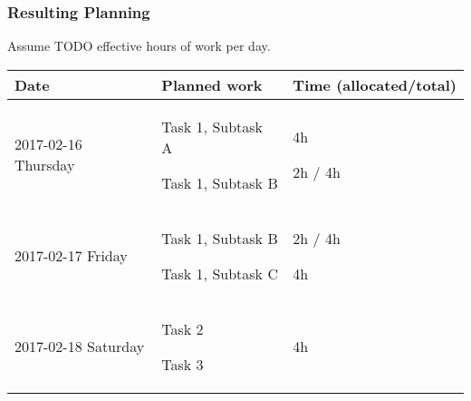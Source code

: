 \subsubsection{Resulting Planning}\label{resulting-planning}
Assume TODO effective hours of work per day.

\begin{longtable}[c]{@{}lll@{}}
\toprule
\begin{minipage}[b]{0.28\columnwidth}\raggedright\strut
Date
\strut\end{minipage} &
\begin{minipage}[b]{0.25\columnwidth}\raggedright\strut
Planned work
\strut\end{minipage} &
\begin{minipage}[b]{0.32\columnwidth}\raggedright\strut
Time (allocated/total)
\strut\end{minipage}\tabularnewline
\midrule
\endhead
\begin{minipage}[t]{0.28\columnwidth}\raggedright\strut
2017-02-16 Thursday
\strut\end{minipage} &
\begin{minipage}[t]{0.25\columnwidth}\raggedright\strut
Task 1, Subtask A

Task 1, Subtask B
\strut\end{minipage} &
\begin{minipage}[t]{0.32\columnwidth}\raggedright\strut
4h

2h / 4h
\strut\end{minipage}\tabularnewline
\begin{minipage}[t]{0.28\columnwidth}\raggedright\strut
2017-02-17 Friday
\strut\end{minipage} &
\begin{minipage}[t]{0.25\columnwidth}\raggedright\strut
Task 1, Subtask B

Task 1, Subtask C
\strut\end{minipage} &
\begin{minipage}[t]{0.32\columnwidth}\raggedright\strut
2h / 4h

4h
\strut\end{minipage}\tabularnewline
\begin{minipage}[t]{0.28\columnwidth}\raggedright\strut
2017-02-18 Saturday
\strut\end{minipage} &
\begin{minipage}[t]{0.25\columnwidth}\raggedright\strut
Task 2

Task 3
\strut\end{minipage} &
\begin{minipage}[t]{0.32\columnwidth}\raggedright\strut
4h


\end{minipage}
\end{longtable}
